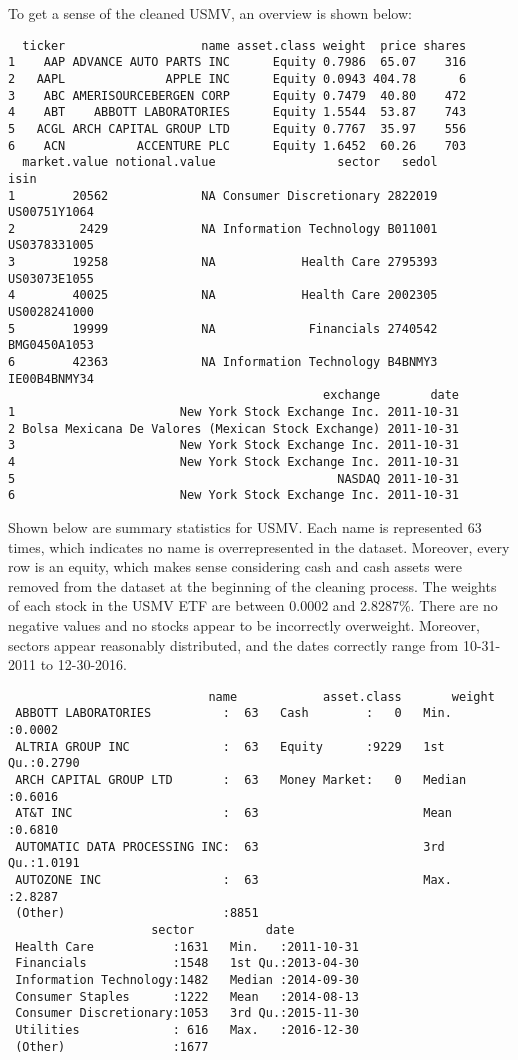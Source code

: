 \documentclass[12pt,twoside]{reedthesis}
\theoremstyle{definition}
\theoremstyle{definition}
\theoremstyle{definition}
\theoremstyle{remark}
\begin{document}
To get a sense of the cleaned USMV, an overview is shown below:
\begin{verbatim}
  ticker                   name asset.class weight  price shares
1    AAP ADVANCE AUTO PARTS INC      Equity 0.7986  65.07    316
2   AAPL              APPLE INC      Equity 0.0943 404.78      6
3    ABC AMERISOURCEBERGEN CORP      Equity 0.7479  40.80    472
4    ABT    ABBOTT LABORATORIES      Equity 1.5544  53.87    743
5   ACGL ARCH CAPITAL GROUP LTD      Equity 0.7767  35.97    556
6    ACN          ACCENTURE PLC      Equity 1.6452  60.26    703
  market.value notional.value                 sector   sedol         isin
1        20562             NA Consumer Discretionary 2822019 US00751Y1064
2         2429             NA Information Technology B011001 US0378331005
3        19258             NA            Health Care 2795393 US03073E1055
4        40025             NA            Health Care 2002305 US0028241000
5        19999             NA             Financials 2740542 BMG0450A1053
6        42363             NA Information Technology B4BNMY3 IE00B4BNMY34
                                            exchange       date
1                       New York Stock Exchange Inc. 2011-10-31
2 Bolsa Mexicana De Valores (Mexican Stock Exchange) 2011-10-31
3                       New York Stock Exchange Inc. 2011-10-31
4                       New York Stock Exchange Inc. 2011-10-31
5                                             NASDAQ 2011-10-31
6                       New York Stock Exchange Inc. 2011-10-31
\end{verbatim}
Shown below are summary statistics for USMV. Each name is represented 63
times, which indicates no name is overrepresented in the dataset.
Moreover, every row is an equity, which makes sense considering cash and
cash assets were removed from the dataset at the beginning of the
cleaning process. The weights of each stock in the USMV ETF are between
0.0002 and 2.8287\%. There are no negative values and no stocks appear
to be incorrectly overweight. Moreover, sectors appear reasonably
distributed, and the dates correctly range from 10-31-2011 to
12-30-2016.
\begin{verbatim}
                            name            asset.class       weight      
 ABBOTT LABORATORIES          :  63   Cash        :   0   Min.   :0.0002  
 ALTRIA GROUP INC             :  63   Equity      :9229   1st Qu.:0.2790  
 ARCH CAPITAL GROUP LTD       :  63   Money Market:   0   Median :0.6016  
 AT&T INC                     :  63                       Mean   :0.6810  
 AUTOMATIC DATA PROCESSING INC:  63                       3rd Qu.:1.0191  
 AUTOZONE INC                 :  63                       Max.   :2.8287  
 (Other)                      :8851                                       
                    sector          date           
 Health Care           :1631   Min.   :2011-10-31  
 Financials            :1548   1st Qu.:2013-04-30  
 Information Technology:1482   Median :2014-09-30  
 Consumer Staples      :1222   Mean   :2014-08-13  
 Consumer Discretionary:1053   3rd Qu.:2015-11-30  
 Utilities             : 616   Max.   :2016-12-30  
 (Other)               :1677                       
\end{verbatim}
\end{document}
